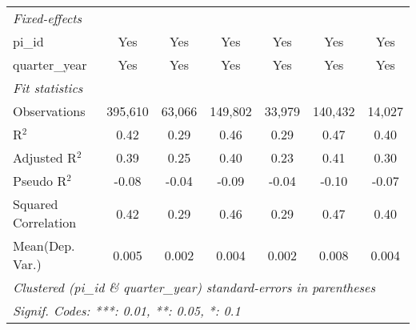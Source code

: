 \begin{tabular}{lcccccc}
   \midrule
   \emph{Fixed-effects}\\
   pi\_id                                                     & Yes            & Yes             & Yes            & Yes           & Yes            & Yes\\  
   quarter\_year                                              & Yes            & Yes             & Yes            & Yes           & Yes            & Yes\\  
   \midrule
   \emph{Fit statistics}\\
   Observations                                               & 395,610        & 63,066          & 149,802        & 33,979        & 140,432        & 14,027\\  
   R$^2$                                                      & 0.42           & 0.29            & 0.46           & 0.29          & 0.47           & 0.40\\  
   Adjusted R$^2$                                             & 0.39           & 0.25            & 0.40           & 0.23          & 0.41           & 0.30\\  
   Pseudo R$^2$                                               & -0.08          & -0.04           & -0.09          & -0.04         & -0.10          & -0.07\\  
   Squared Correlation                                        & 0.42           & 0.29            & 0.46           & 0.29          & 0.47           & 0.40\\  
Mean(Dep. Var.) & 0.005 & 0.002 & 0.004 & 0.002 & 0.008 & 0.004 \\
   \midrule \midrule
   \multicolumn{7}{l}{\emph{Clustered (pi\_id \& quarter\_year) standard-errors in parentheses}}\\
   \multicolumn{7}{l}{\emph{Signif. Codes: ***: 0.01, **: 0.05, *: 0.1}}\\
\end{tabular}
\par\endgroup
